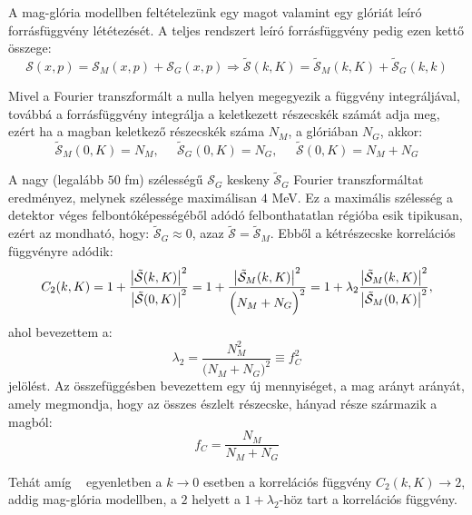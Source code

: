 \documentclass[11pt,a4paper]{article}
\numberwithin{equation}{subsection}
\numberwithin{figure}{section}
\begin{document}
A mag-glória modellben feltételezünk egy magot valamint egy glóriát leíró forrásfüggvény lététezését. A teljes rendszert leíró forrásfüggvény pedig ezen kettő összege:
\begin{equation}
\mathcal{S}(x,p)=\mathcal{S}_M(x,p)+ \mathcal{S}_G(x,p)\Longrightarrow \mathcal{\tilde{S}}(k, K) = \mathcal{\tilde{S}}_M(k,K)+\mathcal{\tilde{S}}_G(k,k)
\end{equation}

Mivel a Fourier transzformált a nulla helyen megegyezik a függvény integráljával, továbbá a forrásfüggvény integrálja a keletkezett részecskék számát adja meg, ezért ha a magban keletkező részecskék száma $N_M$, a glóriában $N_G$, akkor:
\begin{equation}
\mathcal{\tilde{S}}_M(0,K) = N_M,\;\;\;\;\; 
\mathcal{\tilde{S}}_G(0,K) = N_G,\;\;\;\;\;
\mathcal{\tilde{S}}(0,K) = N_M+N_G
\end{equation}

A nagy (legalább $50$ fm) szélességű $\mathcal{S}_G$ keskeny $\mathcal{\tilde{S}}_G$ Fourier transzformáltat eredményez, melynek  szélessége maximálisan $4$ MeV. Ez a maximális szélesség a detektor véges felbontóképességéből adódó felbonthatatlan régióba esik tipikusan, ezért az mondható, hogy: $\mathcal{\tilde{S}}_G\approx 0$, azaz $\mathcal{\tilde{S}}=\mathcal{\tilde{S}}_M$. Ebből a kétrészecske korrelációs függvényre adódik:
\begin{equation}
C_2({k}, {K})=1+\frac{\abs{\tilde{\mathcal{S}}({k},{K})}^2}{\abs{\tilde{\mathcal{S}}(0,{K})}^2} =
1+\frac{\abs{\tilde{\mathcal{S}}_M({k},{K})}^2}{\Big(N_M+N_G\Big)^2}
 =
  1+\lambda_2\frac{\abs{\tilde{\mathcal{S}}_M({k},{K})}^2}{\abs{\tilde{\mathcal{S}}_M(0,{K})}^2},
 \label{eq:CHC2}
\end{equation}
ahol bevezettem a:
\begin{equation}
\lambda_2=\frac{N_M^2}{\Big(N_M+N_G\Big)^2} \equiv f_C^2
\label{eq:CHlambda2}
\end{equation}
jelölést. Az összefüggésben bevezettem egy új mennyiséget, a mag arányt arányát, amely megmondja, hogy az összes észlelt részecske, hányad része származik a magból:
\begin{equation}
f_C=\frac{N_M}{N_M+N_G}
\label{eq:fC}
\end{equation}

Tehát amíg ~ egyenletben a $k\rightarrow 0$ esetben a korrelációs függvény $C_2(k,K)\rightarrow 2$, addig mag-glória modellben, a $2$ helyett a $1+\lambda_2$-höz tart a korrelációs függvény.
\end{document}
